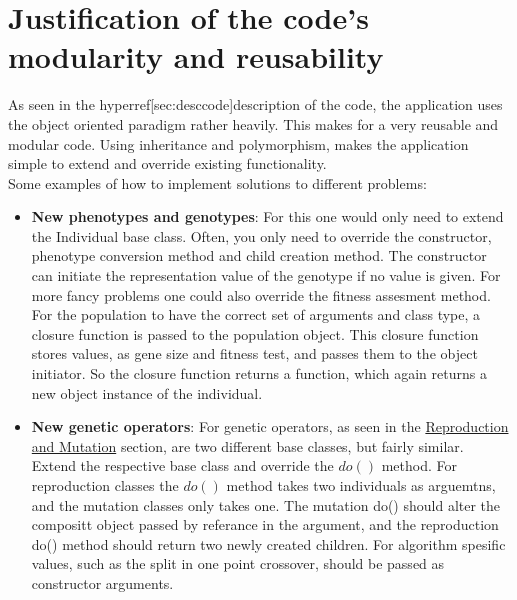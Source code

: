 \section{Justification of the code's modularity and reusability}

As seen in the hyperref[sec:desccode]{description of the code}, the application uses the object oriented paradigm
rather heavily. This makes for a very reusable and modular code. Using inheritance and polymorphism, makes the
application simple to extend and override existing functionality. \\

Some examples of how to implement solutions to different problems:
\begin{itemize}

\item \textbf{New phenotypes and genotypes}: For this one would only need to extend the Individual base class. Often, you only need to override the constructor, phenotype conversion method and child creation method. The constructor can initiate the representation value of the genotype if no value is given. For more fancy problems one could also override the fitness assesment method. For the population to have the correct set of arguments and class type, a closure function is passed to the population object. This closure function stores values, as gene size and fitness test, and passes them to the object initiator. So the closure function returns a function, which again returns a new object instance of the individual.

\item \textbf{New genetic operators}: For genetic operators, as seen in the \hyperref[sec:repmut]{Reproduction and Mutation} section, are two different base classes, but fairly similar. Extend the respective base class and override the $do()$ method. For reproduction classes the $do()$ method takes two individuals as arguemtns, and the mutation classes only takes one. The mutation do() should alter the compositt object passed by referance in the argument, and the reproduction do() method should return two newly created children. For algorithm spesific values, such as the split in one point crossover, should be passed as constructor arguments. 


\end{itemize}
